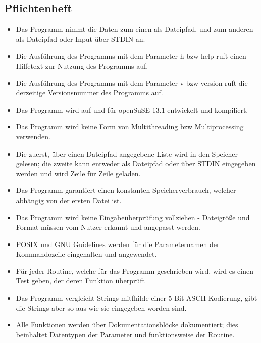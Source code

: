 \subsection{Pflichtenheft}
\label{auszug:pflichtenheft}
\begin{itemize}

    \item Das Programm nimmt die Daten zum einen als Dateipfad, und zum anderen als Dateipfad oder Input über STDIN an.

    \item Die Ausführung des Programms mit dem Parameter \-h bzw \-\-help ruft einen Hilfetext zur Nutzung des Programms auf.

    \item Die Ausführung des Programms mit dem Parameter \-v bzw \-\-version ruft die derzeitige Versionsnummer des Programms auf.

    \item Das Programm wird auf und für openSuSE 13.1 entwickelt und kompiliert.

    \item Das Programm wird keine Form von Multithreading bzw Multiprocessing verwenden.

    \item Die zuerst, über einen Dateipfad angegebene Liste wird in den Speicher gelesen;
    die zweite kann entweder als Dateipfad oder über STDIN eingegeben werden und wird Zeile für Zeile geladen.

    \item Das Programm garantiert einen konstanten Speicherverbrauch, welcher abhängig von der ersten Datei ist.

    \item Das Programm wird keine Eingabeüberprüfung vollziehen - Dateigröße und Format müssen vom Nutzer erkannt und angepasst werden.

    \item POSIX und GNU Guidelines werden für die Parameternamen der Kommandozeile eingehalten und angewendet.

    \item Für jeder Routine, welche für das Programm geschrieben wird, wird es einen Test geben, der deren Funktion überprüft

    \item Das Programm vergleicht Strings mitfhilde einer 5-Bit ASCII Kodierung, gibt die Strings aber so aus wie sie eingegeben worden sind.

    \item Alle Funktionen werden über Dokumentationsblöcke dokumentiert; dies beinhaltet Datentypen der Parameter und funktionsweise der Routine.

\end{itemize}

